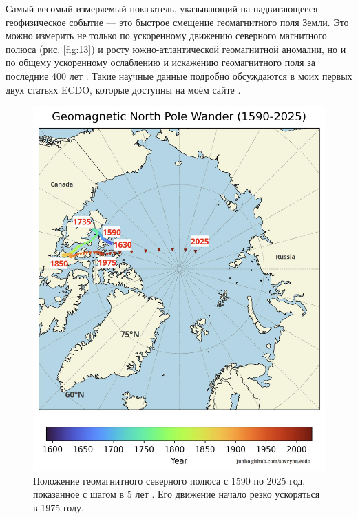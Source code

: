 \documentclass[10pt,twocolumn,letterpaper]{article}
\begin{document}
Самый весомый измеряемый показатель, указывающий на надвигающееся геофизическое событие — это быстрое смещение геомагнитного поля Земли. Это можно измерить не только по ускоренному движению северного магнитного полюса (рис. \ref{fig:13}) и росту южно-атлантической геомагнитной аномалии, но и по общему ускоренному ослаблению и искажению геомагнитного поля за последние 400 лет \cite{3}. Такие научные данные подробно обсуждаются в моих первых двух статьях ECDO, которые доступны на моём сайте \cite{3}.

\begin{figure}[t]

\begin{center}
   \includegraphics[width=1\linewidth]{npw.jpg}
\end{center}
   \caption{Положение геомагнитного северного полюса с 1590 по 2025 год, показанное с шагом в 5 лет \cite{41}. Его движение начало резко ускоряться в 1975 году.}
\label{fig:13}
\label{fig:onecol}
\end{figure}
\end{document}
